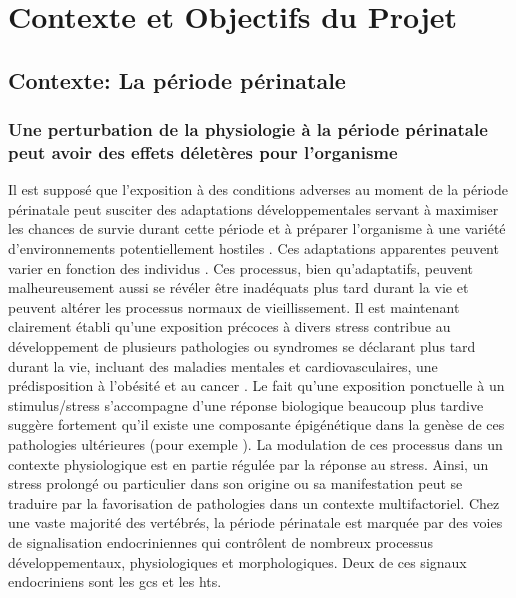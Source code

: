 \documentclass[../main.tex]{subfiles}
\begin{document}
\chapter{Contexte et Objectifs du Projet}




\section{Contexte: La période périnatale}


\subsection{Une perturbation de la physiologie à la période périnatale peut avoir des effets déletères pour l'organisme}

Il est supposé que l'exposition à des conditions adverses au moment de la période périnatale peut susciter des adaptations développementales servant à maximiser les chances de survie durant cette période et à préparer l'organisme à une variété d'environnements potentiellement hostiles \citep{Angelier2013,Crespi2013,Patterson2014}.
Ces adaptations apparentes peuvent varier en fonction des individus \citep{Cockrem2013}.
Ces processus, bien qu'adaptatifs, peuvent malheureusement aussi se révéler être inadéquats plus tard durant la vie et peuvent altérer les processus normaux de vieillissement.
Il est maintenant clairement établi qu'une exposition précoces à divers stress contribue au développement de plusieurs pathologies ou syndromes se déclarant plus tard durant la vie, incluant des maladies mentales et cardiovasculaires, une prédisposition à l'obésité et au cancer \citep{Braun2013,Harris2011,Plagemann2006,Challis2000,Davis2013,Barnes2011}.
Le fait qu'une exposition ponctuelle à un stimulus/stress s'accompagne d'une réponse biologique beaucoup plus tardive suggère fortement qu'il existe une composante épigénétique dans la genèse de ces pathologies ultérieures (pour exemple \citealp{Weaver2004,Begum2013,Crudo2012,Drake2012}).
La modulation de ces processus dans un contexte physiologique est en partie régulée par la réponse au stress.
Ainsi, un stress prolongé ou particulier dans son origine ou sa manifestation peut se traduire par la favorisation de pathologies dans un contexte multifactoriel.
Chez une vaste majorité des vertébrés, la période périnatale est marquée par des voies de signalisation endocriniennes qui contrôlent de nombreux processus développementaux, physiologiques et morphologiques.
Deux de ces signaux endocriniens sont les \glspl{gc} et les \glspl{ht}.
\end{document}
